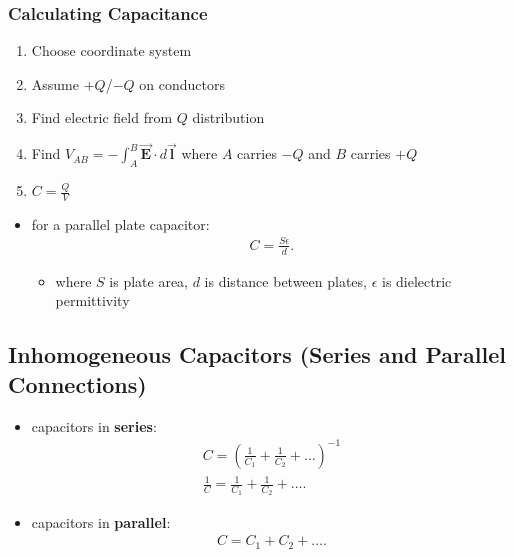 \documentclass[10pt]{article}
\begin{document}
\subsubsection{Calculating Capacitance}
\begin{enumerate}
    \item Choose coordinate system
    \item Assume $+Q$/$-Q$ on conductors
    \item Find electric field from $Q$ distribution
    \item Find $V_{AB} = - \int_{A}^{B} \bm{\vec{E} } \cdot d\bm{\vec{l} }$ where $A$ carries $-Q$ and $B$ carries $+Q$ 
    \item $C = \frac{Q}{V}$
\end{enumerate}
\begin{itemize}
    \item for a parallel plate capacitor:
        \begin{gather*}
            C = \frac{S \epsilon}{d}
        .\end{gather*}
        \begin{itemize}
            \item where $S$ is plate area, $d$ is distance between plates, $\epsilon$ is dielectric permittivity
        \end{itemize}
\end{itemize}

\subsection{Inhomogeneous Capacitors (Series and Parallel Connections)}
\begin{itemize}
    \item capacitors in \textbf{series}:
        \begin{gather*}
            C = \left( \frac{1}{C_1} + \frac{1}{C_2} + \ldots \right)^{-1} \\ 
            \frac{1}{C} = \frac{1}{C_1} + \frac{1}{C_2} + \ldots
        .\end{gather*}
    \item capacitors in \textbf{parallel}:
        \begin{gather*}
            C = C_1 + C_2 + \ldots
        .\end{gather*}
\end{itemize}
\end{document}
